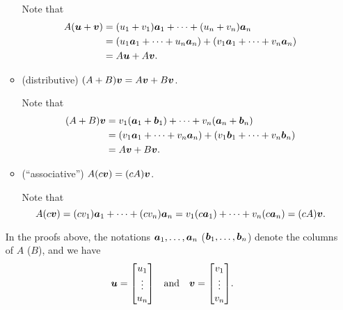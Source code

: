 \begin{enumerate}
\begin{itemize}
\begin{pf}
Note that
\begin{align*}
A(\vb*{u}+\vb*{v})
&=(u_1+v_1)\vb*{a}_{1}+\dotsb+(u_n+v_n)\vb*{a}_{n}\\
&=(u_1\vb*{a}_{1}+\dotsb+u_n\vb*{a}_{n})
+(v_1\vb*{a}_{1}+\dotsb+v_n\vb*{a}_{n})\\
&=A\vb*{u}+A\vb*{v}.
\end{align*}
\end{pf}
\item (distributive) \((A+B)\vb*{v}=A\vb*{v}+B\vb*{v}\).

\begin{pf}
Note that
\begin{align*}
(A+B)\vb*{v}
&=v_1(\vb*{a}_{1}+\vb*{b}_{1})+\dotsb+v_n(\vb*{a}_{n}+\vb*{b}_{n})\\
&=(v_1\vb*{a}_{1}+\dotsb+v_n\vb*{a}_{n})
+(v_1\vb*{b}_1+\dotsb+v_n\vb*{b}_n)\\
&=A\vb*{v}+B\vb*{v}.
\end{align*}
\end{pf}
\item (``associative'') \(A(c\vb*{v})=(cA)\vb*{v}\).

\begin{pf}
Note that
\[
A(c\vb*{v})
=(cv_1)\vb*{a}_{1}+\dotsb+(cv_n)\vb*{a}_{n}
=v_1(c\vb*{a}_{1})+\dotsb+v_n(c\vb*{a}_{n})
=(cA)\vb*{v}.
\]
\end{pf}
\end{itemize}
\begin{note}
In the proofs above, the notations \(\vb*{a}_{1},\dotsc,\vb*{a}_{n}\)
(\(\vb*{b}_{1},\dotsc,\vb*{b}_{n}\)) denote the columns of \(A\) (\(B\)), and
we have
\[
\vect{u}=\mqty[u_1\\\vdots\\ u_n]\qqtext{and}
\vect{v}=\mqty[v_1\\\vdots\\ v_n].
\]
\end{note}
\end{enumerate}
